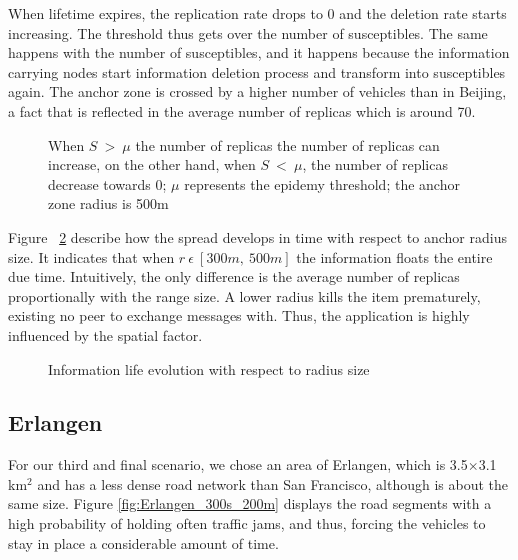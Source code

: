 When lifetime expires, the replication rate drops to 0 and the deletion rate
starts increasing. The threshold thus gets over the number of susceptibles.
The same happens with the number of susceptibles, and it happens because the
information carrying nodes start information deletion process and transform into
susceptibles again. The anchor zone is crossed by a higher number of vehicles
than in Beijing, a fact that is reflected in the average number of replicas
which is around 70.

\begin{figure}[h]
	\centering
	\def\svgwidth{\columnwidth}
	
	\caption{When $S\ >\ \mu$ the number of replicas the number of replicas can
	increase, on the other hand, when $S\ <\ \mu$, the number of replicas decrease
	towards 0; $\mu$ represents the epidemy threshold; the anchor zone radius is
	500m}
 	\label{fig:SanFrancisco_info_epidemy}
 \end{figure}
 
 Figure ~\ref{fig:SanFrancisco_info_evolution_range} describe how the spread
 develops in time with respect to anchor radius size. It indicates that when $r\
 \epsilon\ [300m,\ 500m]$ the information floats the entire due time.
 Intuitively, the only difference is the average number of replicas
 proportionally with the range size. A lower radius kills the item prematurely,
 existing no peer to exchange messages with. Thus, the application is
 highly influenced by the spatial factor. 
 
 \begin{figure}[h]
	\centering
	\def\svgwidth{\columnwidth}
	
	\caption{Information life evolution with respect to radius size}
 	\label{fig:SanFrancisco_info_evolution_range}
 \end{figure}
 
\subsection{Erlangen}

For our third and final scenario, we chose an area of Erlangen, which is
3.5$\times$3.1 km$^2$ and has a less dense road network than San Francisco,
although is about the same size. Figure \ref{fig:Erlangen_300s_200m} displays
the road segments with a high probability of holding often traffic jams, and
thus, forcing the vehicles to stay in place a considerable amount of time.


